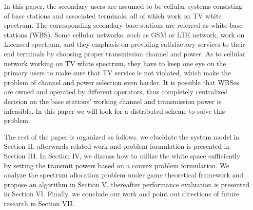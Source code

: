 In this paper, the secondary users are assumed to be cellular systems consisting of base stations and associated terminals, all of which work on TV white spectrum. The corresponding secondary base stations are referred as white base stations (WBS). Some cellular networks, such as GSM or LTE network, work on Licensed spectrum, and they emphasis on providing satisfactory services to their end terminals by choosing proper transmission channel and power. As to cellular network working on TV white spectrum, they have to keep one eye on the primary users to make sure that TV service is not violated, which make the problem of channel and power selection even harder. It is possible that WBSes are owned and operated by different operators, thus completely centralized decision on the base stations' working channel and transmission power is infeasible. In this paper we will look for a distributed scheme to solve this problem.

The rest of the paper is organized as follows. we elucidate the system model in Section II, afterwards related work and problem formulation is presented in Section III. In Section IV, we discuss how to utilize the white space sufficiently by setting the transmit powers based on a convex problem formulation. We analyze the spectrum allocation problem under game theoretical framework and propose an algorithm in Section V, thereafter performance evaluation is presented in Section VI. Finally, we conclude our work and point out directions of future research in Section VII.


